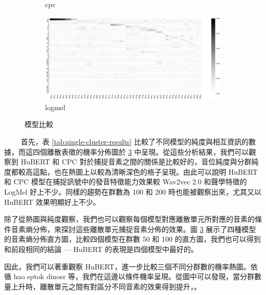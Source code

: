 {\begin{figure}
\begin{subfigure}[t]{0.3\textwidth}
         \caption{cpc}
         \label{fig:ch3-heatmap-model--cpc-50-joint-byprob}
     \end{subfigure}
     \vfill
     \begin{subfigure}[t]{0.3\textwidth}
         \centering
         \includegraphics[width=1\linewidth]{figures/logmel-50-joint-byprob.png}
         \caption{logmel}
         \label{fig:ch3-heatmap-model--logmel-50-joint-byprob}
     \end{subfigure}
     \caption{模型比較}
     \label{fig:ch3-heatmap-model-comparison}
\end{figure}
}
　　
          首先，表 \ref{tab:single-cluster-results} 比較了不同模型的純度與相互資訊的數據，而這四個離散表徵的機率分佈圖於 \ref{fig:ch3-heatmap-model-comparison} 中呈現。從這些分析結果，我們可以觀察到 HuBERT 和 CPC 對於捕捉音素之間的關係是比較好的，音位純度與分群純度都較高這點，也在熱圖上以較為清晰深色的格子呈現。由此可以說明 HuBERT 和 CPC 模型在捕捉訊號中的發音特徵能力效果較 Wav2vec 2.0 和聲學特徵的 LogMel 好上不少。同樣的趨勢在群數為 100 和 200 時也能被觀察出來，尤其又以 HuBERT 效果明顯好上不少。

        除了從熱圖與純度觀察，我們也可以觀察每個模型對應離散單元所對應的音素的條件音素熵分佈，來探討這些離散單元捕捉音素分佈的效果。圖 \ref{fig:ch3-heatmap-model-comparison} 展示了四種模型的音素熵分佈直方圖，比較四個模型在群數 50 和 100 的直方圖，我們也可以得到和前段相同的結論 --- HuBERT 的表現是四個模型中最好的。

        因此，我們可以著重觀察 HuBERT，進一步比較三個不同分群數的機率熱圖。依循 hao sptok dinosr 等，我們在這邊以條件機率呈現。從圖中可以發現，當分群數量上升時，離散單元之間有對區分不同音素的效果得到提升，\cite{10.5555/177910.177914}。